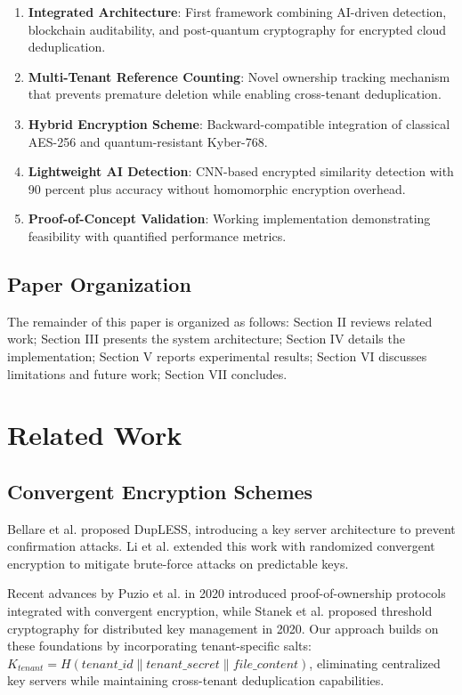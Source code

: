 \documentclass[conference]{IEEEtran}
\begin{document}
\begin{enumerate}
\item \textbf{Integrated Architecture}: First framework combining AI-driven detection, blockchain auditability, and post-quantum cryptography for encrypted cloud deduplication.
\item \textbf{Multi-Tenant Reference Counting}: Novel ownership tracking mechanism that prevents premature deletion while enabling cross-tenant deduplication.
\item \textbf{Hybrid Encryption Scheme}: Backward-compatible integration of classical AES-256 and quantum-resistant Kyber-768.
\item \textbf{Lightweight AI Detection}: CNN-based encrypted similarity detection with 90 percent plus accuracy without homomorphic encryption overhead.
\item \textbf{Proof-of-Concept Validation}: Working implementation demonstrating feasibility with quantified performance metrics.
\end{enumerate}

\subsection{Paper Organization}
The remainder of this paper is organized as follows: Section II reviews related work; Section III presents the system architecture; Section IV details the implementation; Section V reports experimental results; Section VI discusses limitations and future work; Section VII concludes.

\section{Related Work}

\subsection{Convergent Encryption Schemes}
Bellare et al. \cite{bellare2013dupless} proposed DupLESS, introducing a key server architecture to prevent confirmation attacks. Li et al. \cite{li2015secure} extended this work with randomized convergent encryption to mitigate brute-force attacks on predictable keys. 

Recent advances by Puzio et al. \cite{puzio2020cloudedup} in 2020 introduced proof-of-ownership protocols integrated with convergent encryption, while Stanek et al. \cite{stanek2020secure} proposed threshold cryptography for distributed key management in 2020. Our approach builds on these foundations by incorporating tenant-specific salts: $K_{tenant} = H(tenant\_id \parallel tenant\_secret \parallel file\_content)$, eliminating centralized key servers while maintaining cross-tenant deduplication capabilities.
\end{document}
